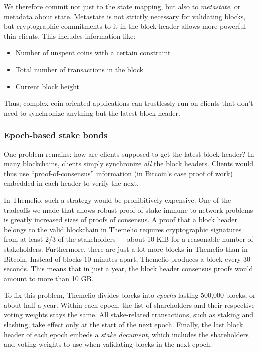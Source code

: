 \documentclass[headinclude]{scrbook}
\begin{document}
We therefore commit not just to the state mapping, but also to \textit{metastate}, or metadata about state. Metastate is not strictly necessary for validating blocks, but cryptographic commitments to it in the block header allows more powerful thin clients. This includes information like:
\begin{itemize}
    \item Number of unspent coins with a certain constraint
    \item Total number of transactions in the block
    \item Current block height
\end{itemize}

Thus, complex coin-oriented applications can trustlessly run on clients that don't need to synchronize anything but the latest block header.

\subsubsection{Epoch-based stake bonds}

One problem remains: how are clients supposed to get the latest block header? In many blockchains, clients simply synchronize \emph{all} the block headers. Clients would thus use ``proof-of-consensus'' information (in Bitcoin's case proof of work) embedded in each header to verify the next.

In Themelio, such a strategy would be prohibitively expensive. One of the tradeoffs we made that allows robust proof-of-stake immune to network problems is greatly increased sizes of proofs of consensus. A proof that a block header belongs to the valid blockchain in Themelio requires cryptographic signatures from at least 2/3 of the stakeholders --- about 10 KiB for a reasonable number of stakeholders. Furthermore, there are just a lot more blocks in Themelio than in Bitcoin. Instead of blocks 10 minutes apart, Themelio produces a block every 30 seconds. This means that in just a year, the block header consensus proofs would amount to more than 10 GB.

To fix this problem, Themelio divides blocks into \textit{epochs} lasting 500,000 blocks, or about half a year. Within each epoch, the list of shareholders and their respective voting weights stays the same. All stake-related transactions, such as staking and slashing, take effect only at the start of the next epoch. Finally, the last block header of each epoch embeds a \textit{stake document}, which includes the shareholders and voting weights to use when validating blocks in the next epoch.
\end{document}
